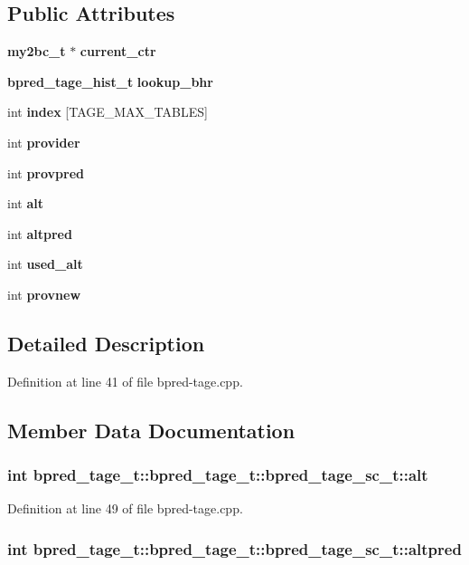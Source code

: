 \subsection*{Public Attributes}
\begin{CompactItemize}
\item 
{\bf my2bc\_\-t} $\ast$ {\bf current\_\-ctr}
\item 
{\bf bpred\_\-tage\_\-hist\_\-t} {\bf lookup\_\-bhr}
\item 
int {\bf index} [TAGE\_\-MAX\_\-TABLES]
\item 
int {\bf provider}
\item 
int {\bf provpred}
\item 
int {\bf alt}
\item 
int {\bf altpred}
\item 
int {\bf used\_\-alt}
\item 
int {\bf provnew}
\end{CompactItemize}


\subsection{Detailed Description}


Definition at line 41 of file bpred-tage.cpp.

\subsection{Member Data Documentation}
\subsubsection[{alt}]{\setlength{\rightskip}{0pt plus 5cm}int bpred\_\-tage\_\-t::bpred\_\-tage\_\-t::bpred\_\-tage\_\-sc\_\-t::alt}\label{classbpred__tage__t_1_1bpred__tage__sc__t_2c391aa9d0a252bf77fe16b645555a2f}




Definition at line 49 of file bpred-tage.cpp.
\subsubsection[{altpred}]{\setlength{\rightskip}{0pt plus 5cm}int bpred\_\-tage\_\-t::bpred\_\-tage\_\-t::bpred\_\-tage\_\-sc\_\-t::altpred}\label{classbpred__tage__t_1_1bpred__tage__sc__t_d5a2bfe3484ddbe4ec39830cfc2a01f9}




